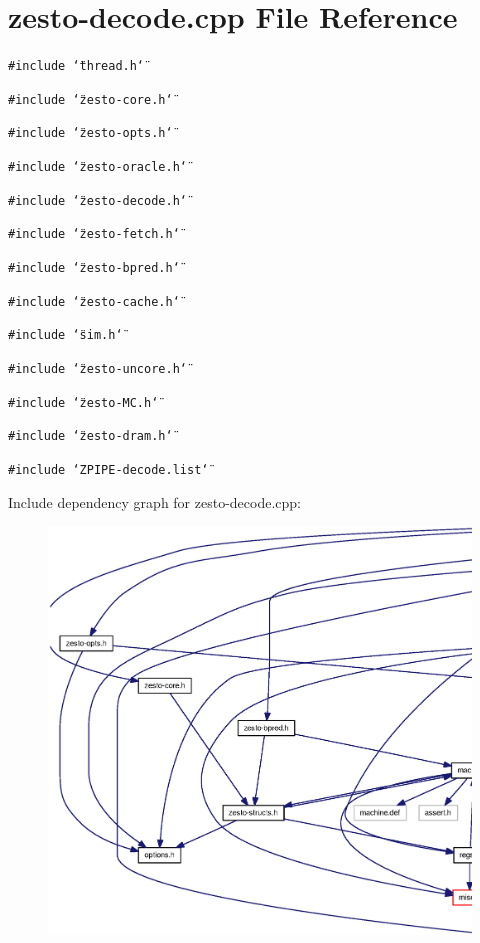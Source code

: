 \section{zesto-decode.cpp File Reference}
\label{zesto-decode_8cpp}
{\tt \#include \char`\"{}thread.h\char`\"{}}\par
{\tt \#include \char`\"{}zesto-core.h\char`\"{}}\par
{\tt \#include \char`\"{}zesto-opts.h\char`\"{}}\par
{\tt \#include \char`\"{}zesto-oracle.h\char`\"{}}\par
{\tt \#include \char`\"{}zesto-decode.h\char`\"{}}\par
{\tt \#include \char`\"{}zesto-fetch.h\char`\"{}}\par
{\tt \#include \char`\"{}zesto-bpred.h\char`\"{}}\par
{\tt \#include \char`\"{}zesto-cache.h\char`\"{}}\par
{\tt \#include \char`\"{}sim.h\char`\"{}}\par
{\tt \#include \char`\"{}zesto-uncore.h\char`\"{}}\par
{\tt \#include \char`\"{}zesto-MC.h\char`\"{}}\par
{\tt \#include \char`\"{}zesto-dram.h\char`\"{}}\par
{\tt \#include \char`\"{}ZPIPE-decode.list\char`\"{}}\par


Include dependency graph for zesto-decode.cpp:\nopagebreak
\begin{figure}[H]
\begin{center}
\leavevmode
\includegraphics[width=420pt]{zesto-decode_8cpp__incl}
\end{center}
\end{figure}
